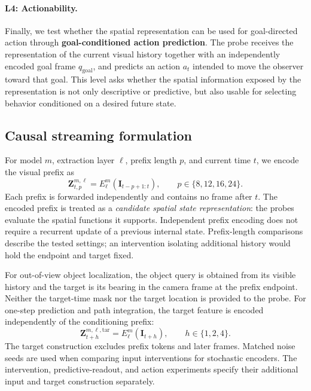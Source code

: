 \documentclass{article} %
\begin{document}
\paragraph{L4: Actionability.}
Finally, we test whether the spatial representation can be used for
goal-directed action through \textbf{goal-conditioned action prediction}. The
probe receives the representation of the
current visual history together with an independently encoded goal frame
$q_{\mathrm{goal}}$, and predicts an action $a_t$ intended to move the
observer toward that goal. This level asks whether the spatial information
exposed by the representation is not only descriptive or predictive, but
also usable for selecting behavior conditioned on a desired future state.

\subsection{Causal streaming formulation}
\label{sec:streaming-evaluation}
For model $m$, extraction layer $\ell$, prefix length $p$, and current time
$t$, we encode the visual prefix as
\begin{equation}
  \mathbf{Z}^{m,\ell}_{t,p}
  =E^m_{\ell}\!\left(\mathbf{I}_{t-p+1:t}\right),
  \qquad p\in\{8,12,16,24\}.
  \label{eq:causal-streaming-feature}
\end{equation}
Each prefix is forwarded independently and contains no frame after $t$.
The encoded prefix is treated as a \emph{candidate spatial state
representation}: the probes evaluate the spatial functions it supports.
Independent prefix encoding does not require a recurrent update of a
previous internal state. Prefix-length comparisons describe the tested
settings; an intervention isolating additional history would hold the
endpoint and target fixed.

For out-of-view object localization, the object query is obtained from its
visible history and the target is its bearing in the camera frame at the
prefix endpoint. Neither the target-time mask nor the target location is
provided to the probe. For one-step prediction and path integration, the
target feature is encoded independently of the conditioning prefix:
\begin{equation}
  \mathbf{Z}^{m,\ell,\mathrm{tar}}_{t+h}
  =E^m_{\ell}\!\left(\mathbf{I}_{t+h}\right),
  \qquad h\in\{1,2,4\}.
  \label{eq:isolated-target-feature}
\end{equation}
The target construction excludes prefix tokens and later frames. Matched
noise seeds are used when comparing input interventions for stochastic
encoders. The intervention, predictive-readout, and action experiments
specify their additional input and target construction separately.
\end{document}
